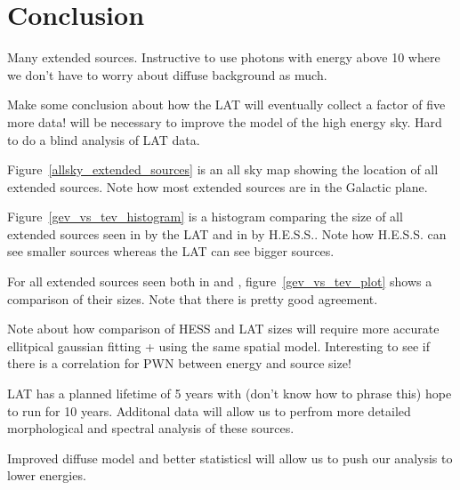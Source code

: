 \documentclass[12pt,preprint]{aastex}
\newcommand{\gev}{\text{GeV}\xspace}
\newcommand{\tev}{\text{TeV}\xspace}
\newcommand{\pointlike}{\text{\em pointlike}\xspace}
\begin{document}
\section{Conclusion}


Many extended sources. Instructive to use photons with energy
above 10 \gev where we don't have to worry about diffuse background
as much.

Make some conclusion about how the LAT will eventually collect a factor
of five more data! \pointlike will be necessary to improve the model of
the high energy sky. Hard to do a blind analysis of LAT data.

Figure~\ref{allsky_extended_sources} is an all sky map showing the
location of all \gev extended sources. Note how most extended sources
are in the Galactic plane.

Figure~\ref{gev_vs_tev_histogram} is a histogram comparing the size of
all extended sources seen in \gev by the LAT and in \tev by H.E.S.S..
Note how H.E.S.S. can see smaller sources whereas the LAT can see
bigger sources.

For all extended sources seen both in \gev and \tev,
figure~\ref{gev_vs_tev_plot} shows a comparison of their sizes.
Note that there is pretty good agreement.

Note about how comparison of HESS and LAT sizes will require more accurate
ellitpical gaussian fitting + using the same spatial model.  Interesting
to see if there is a correlation for PWN between energy and source size!

LAT has a planned lifetime of 5 years with (don't know how to phrase this) 
hope to run for 10 years. Additonal data will allow us to perfrom
more detailed morphological and spectral analysis of these sources.

Improved diffuse model and better statisticsl will allow us to push
our analysis to lower energies.



\end{document}
